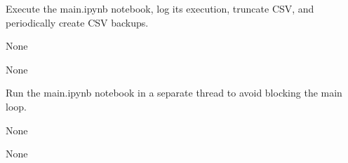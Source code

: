 \documentclass[letterpaper,10pt,english]{sphinxmanual}
\begin{document}

\begin{fulllineitems}
\label{\detokenize{network_watcher:network_watcher.run_main_notebook_with_backup}}
\pysigstartsignatures
{}
\pysigstopsignatures
\sphinxAtStartPar
Execute the main.ipynb notebook, log its execution, truncate CSV, and periodically create CSV backups.
\begin{description}
\sphinxAtStartPar
None

\sphinxAtStartPar
None

\end{description}

\end{fulllineitems}


\begin{fulllineitems}
\label{\detokenize{network_watcher:network_watcher.run_notebook_in_thread}}
\pysigstartsignatures
{}
\pysigstopsignatures
\sphinxAtStartPar
Run the main.ipynb notebook in a separate thread to avoid blocking the main loop.
\begin{description}
\sphinxAtStartPar
None

\sphinxAtStartPar
None

\end{description}

\end{fulllineitems}

\end{document}
